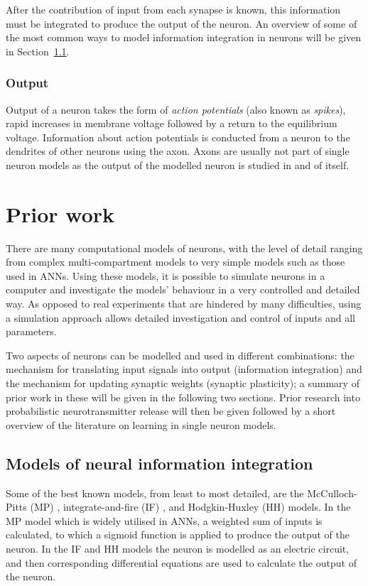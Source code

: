\documentclass[a4paper,12pt]{report}
\theoremstyle{definition}
\begin{document}
After the contribution of input from each synapse is known, this information must be integrated to produce the output of the neuron. An overview of some of the most common ways to model information integration in neurons will be given in Section~\ref{subsec:modelsofintegration}.

\subsubsection{Output}

Output of a neuron takes the form of \emph{action potentials} (also known as \emph{spikes}), rapid increases in membrane voltage followed by a return to the equilibrium voltage. Information about action potentials is conducted from a neuron to the dendrites of other neurons using the axon. Axons are usually not part of single neuron models as the output of the modelled neuron is studied in and of itself.

\section{Prior work}


There are many computational models of neurons, with the level of detail ranging from complex multi-compartment models to very simple models such as those used in ANNs. Using these models, it is possible to simulate neurons in a computer and investigate the models' behaviour in a very controlled and detailed way. As opposed to real experiments that are hindered by many difficulties, using a simulation approach allows detailed investigation and control of inputs and all parameters.

Two aspects of neurons can be modelled and used in different combinations: the mechanism for translating input signals into output (information integration) and the mechanism for updating synaptic weights (synaptic plasticity); a summary of prior work in these will be given in the following two sections. Prior research into probabilistic neurotransmitter release will then be given followed by a short overview of the literature on learning in single neuron models.


\subsection{Models of neural information integration}
\label{subsec:modelsofintegration}

Some of the best known models, from least to most detailed, are the McCulloch-Pitts (MP) \cite{mcculloch1943logical}, integrate-and-fire (IF) \cite{lapicque1907recherches}, and Hodgkin-Huxley (HH) \cite{hodgkin1952quantitative} models. In the MP model which is widely utilised in ANNs, a weighted sum of inputs is calculated, to which a sigmoid function is applied to produce the output of the neuron. In the IF and HH models the neuron is modelled as an electric circuit, and then corresponding differential equations are used to calculate the output of the neuron.
\end{document}

